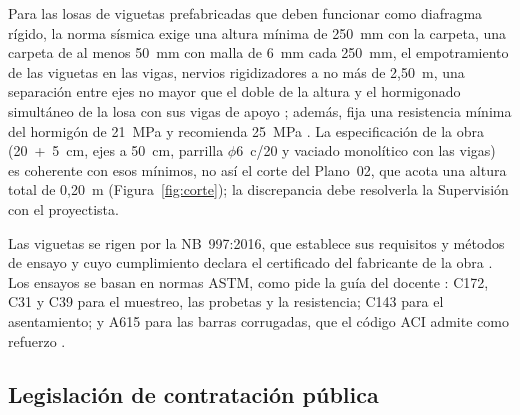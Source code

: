 Para las losas de viguetas prefabricadas que deben funcionar como diafragma rígido, la norma sísmica exige una altura mínima de 250~mm con la carpeta, una carpeta de al menos 50~mm con malla de 6~mm cada 250~mm, el empotramiento de las viguetas en las vigas, nervios rigidizadores a no más de 2,50~m, una separación entre ejes no mayor que el doble de la altura y el hormigonado simultáneo de la losa con sus vigas de apoyo \parencite[art.~12, p.~22]{mopsv2023nbds}; además, fija una resistencia mínima del hormigón de 21~MPa y recomienda 25~MPa \parencite[art.~16, p.~28]{mopsv2023nbds}. La especificación de la obra (20~+~5~cm, ejes a 50~cm, parrilla $\phi$6~c/20 y vaciado monolítico con las vigas) es coherente con esos mínimos, no así el corte del Plano~02, que acota una altura total de 0,20~m (Figura~\ref{fig:corte}); la discrepancia debe resolverla la Supervisión con el proyectista.

Las viguetas se rigen por la NB~997:2016, que establece sus requisitos y métodos de ensayo \parencite{nb997_2016} y cuyo cumplimiento declara el certificado del fabricante de la obra \parencite{pretensa2025}. Los ensayos se basan en normas ASTM, como pide la guía del docente \parencite[diapositiva~25]{barrios2021documento}: C172, C31 y C39 para el muestreo, las probetas y la resistencia; C143 para el asentamiento; y A615 para las barras corrugadas, que el código ACI admite como refuerzo \parencite[sección~20.2.1.3]{aci318_2025}.

\subsection{Legislación de contratación pública}

